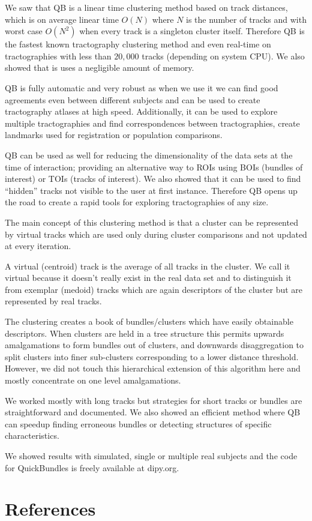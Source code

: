 \documentclass[preprint,authoryear,a4paper,10pt,onecolumn]{elsarticle}
\begin{document}
We saw that QB is a linear time clustering method based on track
distances, which is on average linear time $O(N)$ where $N$ is the
number of tracks and with worst case $O(N^{2})$ when every track is a
singleton cluster itself. Therefore QB is the fastest known tractography
clustering method and even real-time on tractographies with less than
$20,000$ tracks (depending on system CPU). We also showed that is uses a
negligible amount of memory.

QB is fully automatic and very robust as when we use it we can find good
agreements even between different subjects and can be used to create
tractography atlases at high speed. Additionally, it can be used to
explore multiple tractographies and find correspondences between
tractographies, create landmarks used for registration or population
comparisons.

QB can be used as well for reducing the dimensionality of the data sets
at the time of interaction; providing an alternative way to ROIs using
BOIs (bundles of interest) or TOIs (tracks of interest). We also showed
that it can be used to find {}``hidden'' tracks not visible to the user
at first instance. Therefore QB opens up the road to create a rapid
tools for exploring tractographies of any size.

The main concept of this clustering method is that a cluster can be
represented by virtual tracks which are used only during cluster
comparisons and not updated at every iteration.

A virtual (centroid) track is the average of all tracks in the cluster.
We call it virtual because it doesn't really exist in the real data set
and to distinguish it from exemplar (medoid) tracks which are again
descriptors of the cluster but are represented by real tracks.

The clustering creates a book of bundles/clusters which have easily
obtainable descriptors. When clusters are held in a tree structure this
permits upwards amalgamations to form bundles out of clusters, and
downwards disaggregation to split clusters into finer sub-clusters
corresponding to a lower distance threshold. However, we did not touch
this hierarchical extension of this algorithm here and mostly
concentrate on one level amalgamations.

We worked mostly with long tracks but strategies for short tracks
or bundles are straightforward and documented. We also showed an efficient
method where QB can speedup finding erroneous bundles or detecting
structures of specific characteristics.

We showed results with simulated, single or multiple real subjects
and the code for QuickBundles is freely available at dipy.org.

\section{References}

%


\end{document}
